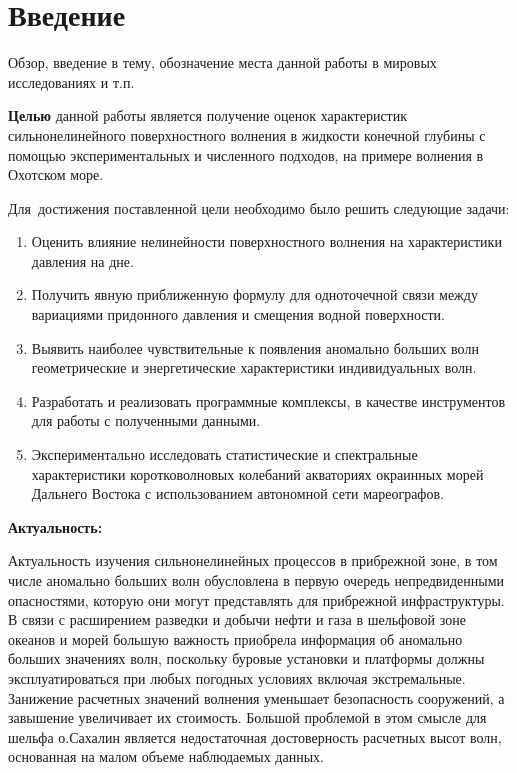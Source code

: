 \chapter*{Введение}							%
Обзор, введение в тему, обозначение места данной работы в мировых исследованиях и т.п.

\textbf{Целью} данной работы является получение оценок характеристик сильнонелинейного поверхностного волнения в жидкости конечной глубины с помощью экспериментальных и численного подходов, на примере волнения в Охотском море.

Для~достижения поставленной цели необходимо было решить следующие задачи:
\begin{enumerate}
  \item Оценить влияние нелинейности поверхностного волнения на характеристики давления на дне.

  \item Получить явную приближенную формулу для одноточечной связи между вариациями придонного давления и  смещения водной поверхности.

  \item Выявить наиболее чувствительные к появления аномально больших волн геометрические и энергетические характеристики индивидуальных волн.

  \item Разработать и реализовать программные комплексы, в качестве инструментов для работы с полученными данными.


  \item Экспериментально исследовать статистические и спектральные характеристики коротковолновых колебаний акваториях окраинных морей Дальнего Востока с использованием автономной сети мареографов.

\end{enumerate}

\textbf{Актуальность:}

Актуальность изучения сильнонелинейных процессов в прибрежной зоне, в том числе аномально больших волн обусловлена в первую очередь непредвиденными опасностями, которую они могут представлять для прибрежной инфраструктуры. В связи с расширением разведки и добычи нефти и газа в шельфовой зоне океанов и морей большую важность приобрела информация об аномально больших значениях волн, поскольку буровые установки и платформы должны эксплуатироваться при любых погодных условиях включая экстремальные. Занижение расчетных значений волнения уменьшает безопасность сооружений, а завышение увеличивает их стоимость. Большой проблемой в этом смысле для шельфа о.Сахалин является недостаточная достоверность расчетных высот волн, основанная на малом объеме наблюдаемых данных.

